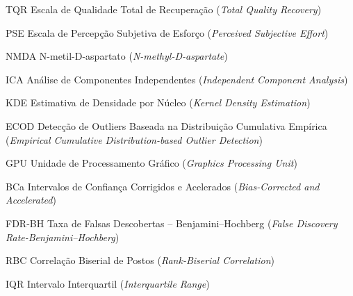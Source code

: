 \documentclass[
  12pt,
  openany,
  twoside,
  a4paper,
  english,
  brazil
]{abntex2}
\begin{document}
\begin{siglas}
  \item[TQR] Escala de Qualidade Total de Recuperação (\textit{Total Quality Recovery})
  \item[PSE] Escala de Percepção Subjetiva de Esforço (\textit{Perceived Subjective Effort})
  \item[NMDA] N-metil-D-aspartato (\textit{N-methyl-D-aspartate})
  \item[ICA] Análise de Componentes Independentes (\textit{Independent Component Analysis})
  \item[KDE] Estimativa de Densidade por Núcleo (\textit{Kernel Density Estimation})
  \item[ECOD] Detecção de Outliers Baseada na Distribuição Cumulativa Empírica (\textit{Empirical Cumulative Distribution-based Outlier Detection})
  \item[GPU] Unidade de Processamento Gráfico (\textit{Graphics Processing Unit})
  \item[BCa] Intervalos de Confiança Corrigidos e Acelerados (\textit{Bias-Corrected and Accelerated})
  \item[FDR-BH] Taxa de Falsas Descobertas – Benjamini–Hochberg (\textit{False Discovery Rate-Benjamini–Hochberg})
  \item[RBC] Correlação Biserial de Postos (\textit{Rank-Biserial Correlation})
  \item[IQR] Intervalo Interquartil (\textit{Interquartile Range})
\end{siglas}
\end{document}
